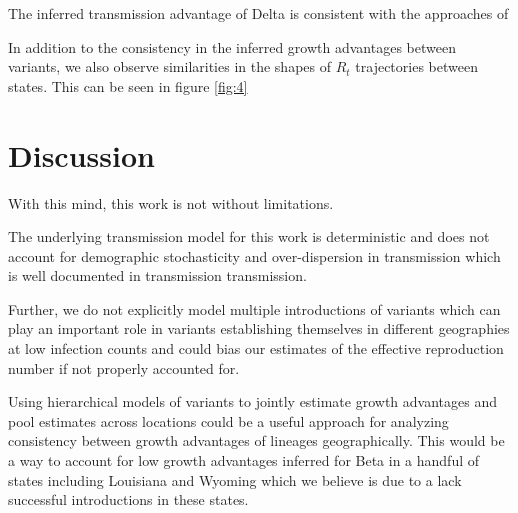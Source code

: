 \documentclass[11pt,oneside,letterpaper]{article}
\begin{document}

The inferred transmission advantage of Delta is consistent with the approaches of %

In addition to the consistency in the inferred growth advantages between variants, we also observe similarities in the shapes of $R_{t}$ trajectories between states. This can be seen in figure \ref{fig:4} %


\section*{Discussion}


With this mind, this work is not without limitations.


The underlying transmission model for this work is deterministic and does not account for demographic stochasticity and over-dispersion in transmission which is well documented in transmission transmission.

Further, we do not explicitly model multiple introductions of variants which can play an important role in variants establishing themselves in different geographies at low infection counts and could bias our estimates of the effective reproduction number if not properly accounted for.

Using hierarchical models of variants to jointly estimate growth advantages and pool estimates across locations could be a useful approach for analyzing consistency between growth advantages of lineages geographically.
This would be a way to account for low growth advantages inferred for Beta in a handful of states including Louisiana and Wyoming which we believe is due to a lack successful introductions in these states.
\end{document}
